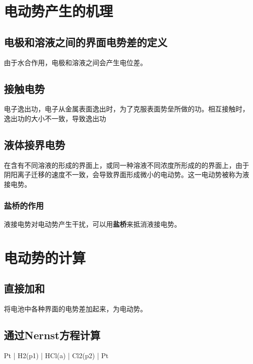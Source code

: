 \section{电动势产生的机理}

    \subsection{电极和溶液之间的界面电势差的定义}

    由于水合作用，电极和溶液之间会产生电位差。

    \subsection{接触电势}

    电子逸出功，电子从金属表面逸出时，为了克服表面势垒所做的功。相互接触时，逸出功的大小不一致，导致逸出功


    \subsection{液体接界电势}

    在含有不同溶液的形成的界面上，或同一种溶液不同浓度所形成的的界面上，由于阴阳离子迁移的速度不一致，会导致界面形成微小的电动势。这一电动势被称为液接电势。

    \subsubsection{盐桥的作用}

    液接电势对电动势产生干扰，可以用\textbf{盐桥}来抵消液接电势。


    \section{电动势的计算}

    \subsection{直接加和}

    将电池中各种界面的电势差加起来，为电动势。

    \subsection{通过Nernst方程计算}

    \begin{reaction*}
        Pt | H2(p1) | HCl(a) | Cl2(p2) | Pt
    \end{reaction*}

